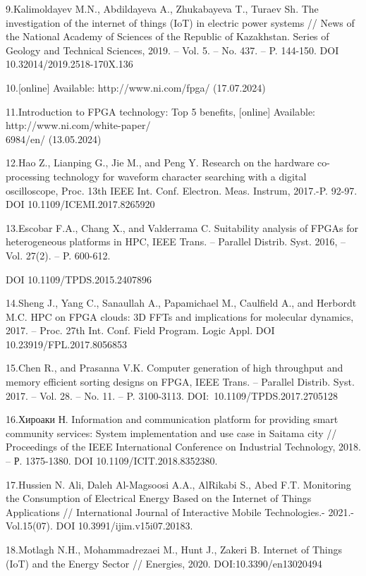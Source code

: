 \begin{noparindent}
9.Kalimoldayev M.N., Abdildayeva A., Zhukabayeva T., Turaev Sh. The
investigation of the internet of things (IoT) in electric power systems // News of the
National Academy of Sciences of the Republic of Kazakhstan. Series of
Geology and Technical Sciences, 2019. -- Vol. 5. -- No. 437. -- P.
144-150. DOI 10.32014/2019.2518-170X.136

10.{[}online{]} Available: http://www.ni.com/fpga/ (17.07.2024)

11.Introduction to FPGA technology: Top 5 benefits, {[}online{]}
Available: http://www.ni.com/white-paper/\\6984/en/ (13.05.2024)

12.Hao Z., Lianping G., Jie M., and Peng Y. Research on the hardware
co-processing technology for waveform character searching with a digital
oscilloscope, Proc. 13th IEEE Int. Conf. Electron. Meas. Instrum,
2017.-P. 92-97. DOI 10.1109/ICEMI.2017.8265920

13.Escobar F.A., Chang X., and Valderrama C. Suitability analysis of
FPGAs for heterogeneous platforms in HPC, IEEE Trans. -- Parallel
Distrib. Syst. 2016, -- Vol. 27(2). -- P. 600-612.

DOI 10.1109/TPDS.2015.2407896

14.Sheng J., Yang C., Sanaullah A., Papamichael M., Caulfield A., and
Herbordt M.C. HPC on FPGA clouds: 3D FFTs and implications for molecular
dynamics, 2017. -- Proc. 27th Int. Conf. Field Program. Logic Appl. DOI
10.23919/FPL.2017.8056853

15.Chen R., and Prasanna V.K. Computer generation of high throughput and
memory efficient sorting designs on FPGA, IEEE Trans. -- Parallel
Distrib. Syst. 2017. -- Vol. 28. -- No. 11. -- P. 3100-3113.
DOI:~10.1109/TPDS.2017.2705128

16.Хироаки Н. Information and communication platform for providing smart
community services: System implementation and use case in Saitama city
// Proceedings of the IEEE International Conference on Industrial
Technology, 2018. -- Р. 1375-1380. DOI 10.1109/ICIT.2018.8352380.

17.Hussien N. Ali, Daleh Al-Magsoosi A.A., AlRikabi S., Abed F.T.
Monitoring the Consumption of Electrical Energy Based on the Internet of
Things Applications // International Journal of Interactive Mobile
Technologies.- 2021.-Vol.15(07). DOI 10.3991/ijim.v15i07.20183.

18.Motlagh N.H., Mohammadrezaei M., Hunt J., Zakeri B. Internet of
Things (IoT) and the Energy Sector // Energies, 2020.
DOI:10.3390/en13020494


\end{noparindent}
